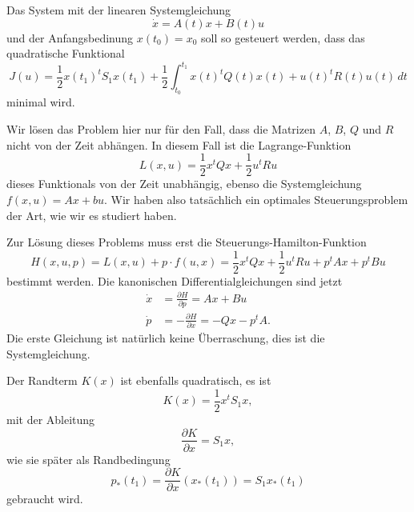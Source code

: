 \begin{aufgabe}
\label{buch:hamiltonjacobi:oc:aufgabe:lqc}
Das System mit der linearen Systemgleichung
\begin{equation}
\dot{x}
=
A(t)x
+
B(t)u
\end{equation}
und der Anfangsbedinung $x(t_0)=x_0$ soll so gesteuert werden,
dass das quadratische Funktional
\begin{equation}
J(u)
=
\frac12 x(t_1)^t S_1 x(t_1)
+
\frac12
\int_{t_0}^{t_1}
x(t)^t Q(t) x(t)
+
u(t)^t R(t) u(t)
\,dt
\end{equation}
minimal wird.
\end{aufgabe}
Wir lösen das Problem hier nur für den Fall, dass die Matrizen $A$, $B$,
$Q$ und $R$ nicht von der Zeit abhängen.
In diesem Fall ist die Lagrange-Funktion
\[
L(x,u)
=
\frac12 x^t Qx + \frac12 u^t Ru
\]
dieses Funktionals von der Zeit unabhängig,
ebenso die Systemgleichung $f(x,u)=Ax+bu$.
Wir haben also tatsächlich ein
optimales Steuerungsproblem der Art, wie wir es studiert haben.

Zur Lösung dieses Problems muss erst die Steuerungs-Hamilton-Funktion
\[
H(x,u,p)
=
L(x,u) + p\cdot f(u,x)
=
\frac12 x^tQx + \frac12 u^tRu + p^tAx + p^tBu
\]
bestimmt werden.
Die kanonischen Differentialgleichungen sind jetzt
\begin{align*}
\dot{x}
&=
\frac{\partial H}{\partial p}
=
Ax
+
Bu
\\
\dot{p}
&=
-\frac{\partial H}{\partial x}
=
-Qx - p^tA.
\end{align*}
Die erste Gleichung ist natürlich keine Überraschung, dies ist die
Systemgleichung.

Der Randterm $K(x)$ ist ebenfalls quadratisch, es ist
\[
K(x) = \frac12 x^t S_1 x,
\]
mit der Ableitung
\begin{equation*}
\frac{\partial K}{\partial x}
=
S_1x,
\end{equation*}
wie sie später als Randbedingung
\[
p_*(t_1)
=
\frac{\partial K}{\partial x}(x_*(t_1))
=
S_1x_*(t_1)
\]
gebraucht wird.

%
%
